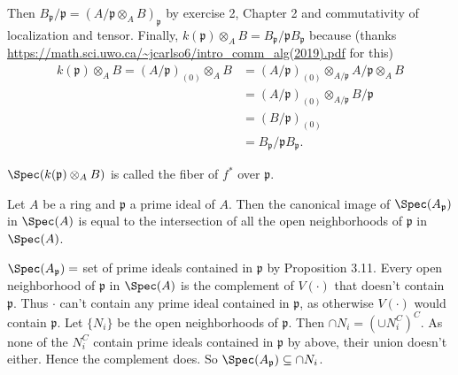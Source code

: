 \begin{questions}
\begin{enumerate}
\begin{solution}
	Then $B_{\mathfrak{p}} / \mathfrak{p} = (A / \mathfrak{p} \otimes_{A} B)_{\mathfrak{p}}$ by exercise 2, Chapter 2 and commutativity of localization and tensor.
	Finally, $k(\mathfrak{p}) \otimes _A B = B_{\mathfrak{p}} / \mathfrak{p} B_{\mathfrak{p}} $ because (thanks \url{https://math.sci.uwo.ca/~jcarlso6/intro_comm_alg(2019).pdf} for this)
	\begin{align*}
		k(\mathfrak{p}) \otimes _A B = (A / \mathfrak{p})_{(0)} \otimes_A B &= (A / \mathfrak{p})_{(0)} \otimes _{A / \mathfrak{p}} A / \mathfrak{p} \otimes _A B \tag{Proposition 3.5}\\
		&= (A / \mathfrak{p})_{(0)} \otimes _{A / \mathfrak{p}} B / \mathfrak{p} \tag{Exercise 2, Chapter 2}\\
		&= (B / \mathfrak{p})_{(0)} \tag{Proposition 3.5}\\
		&= B_{\mathfrak{p}} / \mathfrak{p}B_{\mathfrak{p}}
	.\end{align*}

\end{solution}
$\Spec(k(\mathfrak{p}) \otimes_A B) $ is called the fiber of $f^\ast $ over $\mathfrak{p} $.
\end{enumerate}

\question Let $A $ be a ring and $\mathfrak{p} $ a prime ideal of $A $. Then the canonical image of $\Spec(A_{\mathfrak{p}}) $ in $\Spec(A) $ is equal to the intersection of all the open neighborhoods of $\mathfrak{p} $ in $\Spec(A) $.
\begin{solution}
	$\Spec(A_{\mathfrak{p}}) = $ set of prime ideals contained in $\mathfrak{p} $ by Proposition 3.11.
	Every open neighborhood of $\mathfrak{p} $ in $\Spec(A) $ is the complement of $V(\cdot) $ that doesn't contain $\mathfrak{p} $.
	Thus $\cdot $ can't contain any prime ideal contained in $\mathfrak{p} $, as otherwise $V(\cdot) $ would contain $\mathfrak{p} $.
	Let $\{N_i\}$ be the open neighborhoods of $\mathfrak{p} $.
	Then $\cap N_i = (\cup N_i^C)^C $.
	As none of the $N_i^C$ contain prime ideals contained in $\mathfrak{p} $ by above, their union doesn't either.
	Hence the complement does.
	So $\Spec(A_{\mathfrak{p}}) \subseteq \cap N_i $.


\end{solution}
\end{questions}

